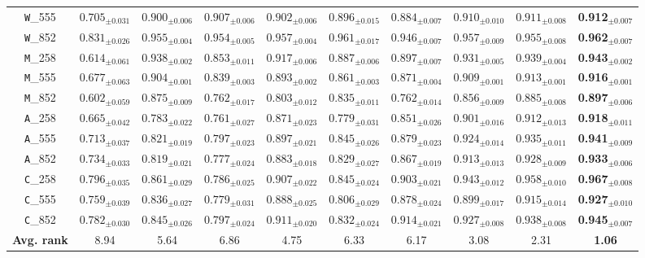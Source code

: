 \documentclass[11pt]{article}
\begin{document}
\begin{table}[htbp]
{\begin{tabular}{c|cccccccc|c}
\texttt{W}\_555 & $0.705_{\pm 0.031}$ & $0.900_{\pm 0.006}$ & $0.907_{\pm 0.006}$ & $0.902_{\pm 0.006}$ & $0.896_{\pm 0.015}$ & $0.884_{\pm 0.007}$ & $0.910_{\pm 0.010}$ & $0.911_{\pm 0.008}$ & \textbf{0.912}$_{\pm 0.007}$ \\
\texttt{W}\_852 & $0.831_{\pm 0.026}$ & $0.955_{\pm 0.004}$ & $0.954_{\pm 0.005}$ & $0.957_{\pm 0.004}$ & $0.961_{\pm 0.017}$ & $0.946_{\pm 0.007}$ & $0.957_{\pm 0.009}$ & $0.955_{\pm 0.008}$ & \textbf{0.962}$_{\pm 0.007}$ \\
\texttt{M}\_258 & $0.614_{\pm 0.061}$ & $0.938_{\pm 0.002}$ & $0.853_{\pm 0.011}$ & $0.917_{\pm 0.006}$ & $0.887_{\pm 0.006}$ & $0.897_{\pm 0.007}$ & $0.931_{\pm 0.005}$ & $0.939_{\pm 0.004}$ & \textbf{0.943}$_{\pm 0.002}$ \\
\texttt{M}\_555 & $0.677_{\pm 0.063}$ & $0.904_{\pm 0.001}$ & $0.839_{\pm 0.003}$ & $0.893_{\pm 0.002}$ & $0.861_{\pm 0.003}$ & $0.871_{\pm 0.004}$ & $0.909_{\pm 0.001}$ & $0.913_{\pm 0.001}$ & \textbf{0.916}$_{\pm 0.001}$ \\
\texttt{M}\_852 & $0.602_{\pm 0.059}$ & $0.875_{\pm 0.009}$ & $0.762_{\pm 0.017}$ & $0.803_{\pm 0.012}$ & $0.835_{\pm 0.011}$ & $0.762_{\pm 0.014}$ & $0.856_{\pm 0.009}$ & $0.885_{\pm 0.008}$ & \textbf{0.897}$_{\pm 0.006}$ \\
\texttt{A}\_258 & $0.665_{\pm 0.042}$ & $0.783_{\pm 0.022}$ & $0.761_{\pm 0.027}$ & $0.871_{\pm 0.023}$ & $0.779_{\pm 0.031}$ & $0.851_{\pm 0.026}$ & $0.901_{\pm 0.016}$ & $0.912_{\pm 0.013}$ & \textbf{0.918}$_{\pm 0.011}$ \\
\texttt{A}\_555 & $0.713_{\pm 0.037}$ & $0.821_{\pm 0.019}$ & $0.797_{\pm 0.023}$ & $0.897_{\pm 0.021}$ & $0.845_{\pm 0.026}$ & $0.879_{\pm 0.023}$ & $0.924_{\pm 0.014}$ & $0.935_{\pm 0.011}$ & \textbf{0.941}$_{\pm 0.009}$ \\
\texttt{A}\_852 & $0.734_{\pm 0.033}$ & $0.819_{\pm 0.021}$ & $0.777_{\pm 0.024}$ & $0.883_{\pm 0.018}$ & $0.829_{\pm 0.027}$ & $0.867_{\pm 0.019}$ & $0.913_{\pm 0.013}$ & $0.928_{\pm 0.009}$ & \textbf{0.933}$_{\pm 0.006}$ \\
\texttt{C}\_258 & $0.796_{\pm 0.035}$ & $0.861_{\pm 0.029}$ & $0.786_{\pm 0.025}$ & $0.907_{\pm 0.022}$ & $0.845_{\pm 0.024}$ & $0.903_{\pm 0.021}$ & $0.943_{\pm 0.012}$ & $0.958_{\pm 0.010}$ & \textbf{0.967}$_{\pm 0.008}$ \\
\texttt{C}\_555 & $0.759_{\pm 0.039}$ & $0.836_{\pm 0.027}$ & $0.779_{\pm 0.031}$ & $0.888_{\pm 0.025}$ & $0.806_{\pm 0.029}$ & $0.878_{\pm 0.024}$ & $0.899_{\pm 0.017}$ & $0.915_{\pm 0.014}$ & \textbf{0.927}$_{\pm 0.010}$ \\
\texttt{C}\_852 & $0.782_{\pm 0.030}$ & $0.845_{\pm 0.026}$ & $0.797_{\pm 0.024}$ & $0.911_{\pm 0.020}$ & $0.832_{\pm 0.024}$ & $0.914_{\pm 0.021}$ & $0.927_{\pm 0.008}$ & $0.938_{\pm 0.008}$ & \textbf{0.945}$_{\pm 0.007}$ \\ 
\midrule
\textbf{Avg. rank} & 8.94 & 5.64 & 6.86 & 4.75 & 6.33 & 6.17 & 3.08 & 2.31  & \textbf{1.06} \\ \bottomrule
\end{tabular}
}
\end{table}
\end{document}
